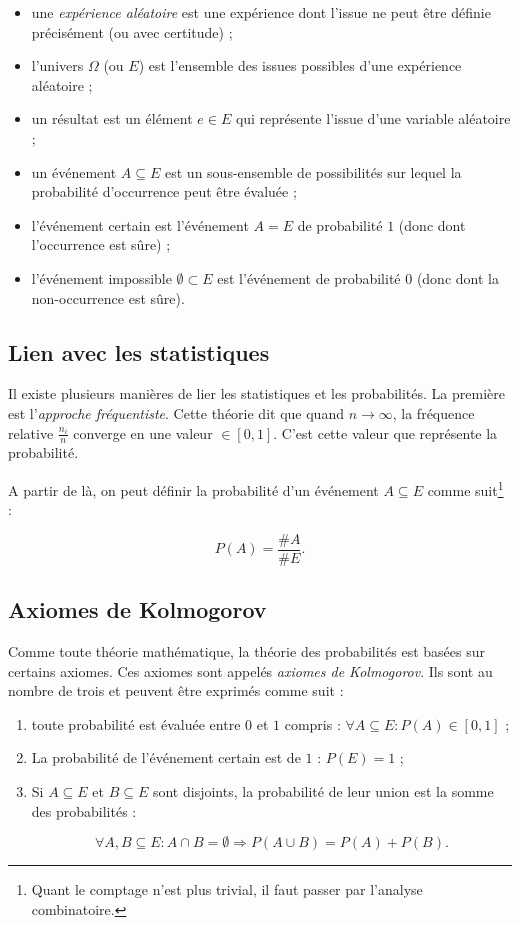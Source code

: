 \documentclass{article}
\begin{document}
		\begin{itemize}
			\item une \textit{expérience aléatoire} est une expérience dont l'issue ne peut être définie précisément (ou avec certitude) ;
			\item l'univers $\Omega$ (ou $E$) est l'ensemble des issues possibles d'une expérience aléatoire ;
			\item un résultat est un élément $e \in E$ qui représente l'issue d'une variable aléatoire ;
			\item un événement $A \subseteq E$ est un sous-ensemble de possibilités sur lequel la probabilité d'occurrence peut être évaluée ;
			\item l'événement certain est l'événement $A = E$ de probabilité $1$ (donc dont l'occurrence est sûre) ;
			\item l'événement impossible $\emptyset \subset E$ est l'événement de probabilité $0$ (donc dont la non-occurrence est sûre).
		\end{itemize}

	\subsection{Lien avec les statistiques}
		Il existe plusieurs manières de lier les statistiques et les probabilités. La première est l'\textit{approche fréquentiste}. Cette théorie dit que quand $n \to \infty$,
		la fréquence relative $\frac {n_i}n$ converge en une valeur $\in [0, 1]$. C'est cette valeur que représente la probabilité.

		A partir de là, on peut définir la probabilité d'un événement $A \subseteq E$ comme suit\footnote{Quant le comptage n'est plus trivial, il faut passer par l'analyse
		combinatoire.} :

		\[P(A) = \frac {\#A}{\#E}.\]

	\subsection{Axiomes de Kolmogorov}
		Comme toute théorie mathématique, la théorie des probabilités est basées sur certains axiomes. Ces axiomes sont appelés \textit{axiomes de Kolmogorov}. Ils sont au nombre
		de trois et peuvent être exprimés comme suit :

		\begin{enumerate}
			\item toute probabilité est évaluée entre $0$ et $1$ compris : $\forall A \subseteq E : P(A) \in [0, 1]$ ;
			\item La probabilité de l'événement certain est de $1$ : $P(E) = 1$ ;
			\item Si $A \subseteq E$ et $B \subseteq E$ sont disjoints, la probabilité de leur union est la somme des probabilités :
				
				  \[\forall A, B \subseteq E : A \cap B = \emptyset \Rightarrow P(A \cup B) = P(A) + P(B).\]
		\end{enumerate}
\end{document}
